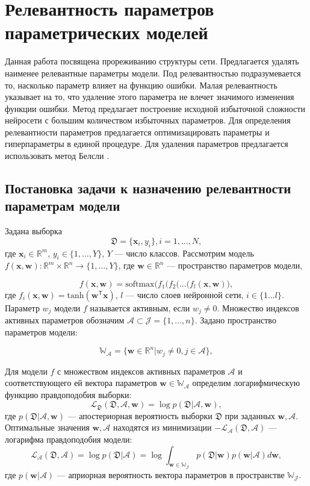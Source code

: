 \newpage

\section{Релевантность параметров параметрических моделей}
Данная работа посвящена прореживанию структуры сети. Предлагается удалять наименее релевантные параметры модели. Под релевантностью \cite{cun1990} подразумевается то, насколько параметр влияет на функцию ошибки. Малая релевантность указывает на то, что удаление этого параметра не влечет значимого изменения функции ошибки. Метод предлагает построение исходной избыточной сложности нейросети с большим количеством избыточных параметров. Для определения релевантности параметров предлагается оптимизацировать параметры и гиперпараметры в единой процедуре. Для удаления параметров предлагается использовать метод Белсли \cite{neychev2016}.

\subsection{Постановка задачи к назначению релевантности параметрам модели}

Задана выборка
\[
\label{2.1}
\mathfrak{D} = \{\textbf{x}_i,y_i\},  i =1,...,N,
\]
где $\textbf{x}_i \in \mathbb{R}^{m}$, $y_i \in \{1, \dots, Y\}$, $Y$ --- число классов.
Рассмотрим модель $f(\mathbf{x}, \mathbf{w}): \mathbb{R}^m \times \mathbb{R}^n \to \{1,\dots,Y\}$, где $\textbf{w} \in \mathbb{R}^n$ --- пространство параметров модели,

\[
\label{2.2}
f(\mathbf{x}, \mathbf{w}) = \text{softmax}\bigl( f_1(f_2(...(f_l(\mathbf{x}, \mathbf{w})\bigr),
\]
где $f_i(\mathbf{x}, \mathbf{w}) =  \text{tanh}(\mathbf{w}^\mathsf{T}\mathbf{x})$, $l$ --- число слоев нейронной сети, $i \in \{1\dots l\}$.
Параметр $w_j$ модели $f$  называется активным, если $w_j \not = 0$. Множество индексов активных параметров обозначим $\mathcal{A} \subset \mathcal{J} = \{1,...,n\}$.
Задано пространство параметров модели:

\[
\label{2.3}
\mathbb{W_\mathcal{A}} = \{ \textbf{w} \in \mathbb{R}^n | w_j\not=0, j \in \mathcal{A}  \},
\]


Для модели $f$ с множеством индексов активных параметров $\mathcal{A}$ и соответствующего ей вектора параметров $\textbf{w} \in \mathbb{W_\mathcal{A}}$  определим логарифмическую функцию правдоподобия выборки:
\[
\label{2.4}
\mathcal{L}_\mathfrak{D}(\mathfrak{D}, \mathcal{A}, \textbf{w}) = \log p(\mathfrak{D}|\mathcal{A}, \textbf{w}),
\]
где $p(\mathfrak{D}|\mathcal{A},\textbf{w})$ --- апостериорная вероятность выборки $\mathfrak{D}$ при заданных $\textbf{w}, \mathcal{A}$.
Оптимальные значения $\textbf{w},\mathcal{A}$ находятся из минимизации $-\mathcal{L}_{\mathcal{A}}(\mathfrak{D},\mathcal{A})$ --- логарифма правдоподобия модели:
\[
\label{2.5}
\mathcal{L}_{\mathcal{A}}(\mathfrak{D},\mathcal{A}) =\log p(\mathfrak{D}|\mathcal{A}) = \log  \int_{{\textbf{w}\in\mathbb{W_\mathcal{J}}}}
p(\mathfrak{D} | \textbf{w}) p(\textbf{w} | \mathcal{A}) d \textbf{w},
\]
где $p(\textbf{w}|\mathcal{A})$ ---  априорная вероятность вектора параметров в пространстве $\mathbb{W_\mathcal{J}}$.

